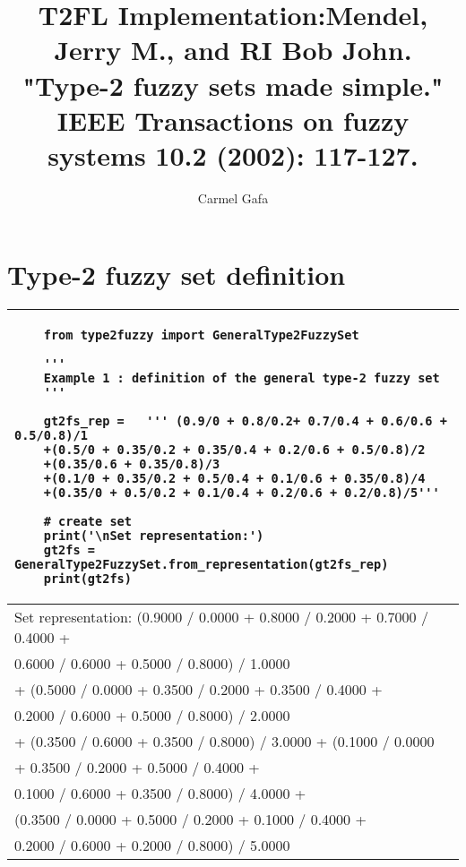 \documentclass[]{article}
\title{T2FL Implementation:Mendel, Jerry M., and RI Bob John. "Type-2 fuzzy sets made simple." IEEE Transactions on fuzzy systems 10.2 (2002): 117-127.}
\author{Carmel Gafa}
\begin{document}
\maketitle

\begin{abstract}

\end{abstract}

\section{Type-2 fuzzy set definition}

\begin{tabular}{|l|}
	\hline 
	\lstset{language=Python}
	\lstset{basicstyle=\scriptsize}
	\begin{lstlisting}
	from type2fuzzy import GeneralType2FuzzySet
	
	'''
	Example 1 : definition of the general type-2 fuzzy set
	'''
	
	gt2fs_rep =   ''' (0.9/0 + 0.8/0.2+ 0.7/0.4 + 0.6/0.6 + 0.5/0.8)/1
	+(0.5/0 + 0.35/0.2 + 0.35/0.4 + 0.2/0.6 + 0.5/0.8)/2
	+(0.35/0.6 + 0.35/0.8)/3
	+(0.1/0 + 0.35/0.2 + 0.5/0.4 + 0.1/0.6 + 0.35/0.8)/4
	+(0.35/0 + 0.5/0.2 + 0.1/0.4 + 0.2/0.6 + 0.2/0.8)/5'''
	
	# create set
	print('\nSet representation:')
	gt2fs = GeneralType2FuzzySet.from_representation(gt2fs_rep)
	print(gt2fs)
	\end{lstlisting}
	
	\\
	\hline
	
	Set representation:
	(0.9000 / 0.0000 + 0.8000 / 0.2000 + 0.7000 / 0.4000 + \\
	0.6000 / 0.6000 + 0.5000 / 0.8000) / 1.0000\\
	 + (0.5000 / 0.0000 + 0.3500 / 0.2000 + 0.3500 / 0.4000 + \\
	 0.2000 / 0.6000 + 0.5000 / 0.8000) / 2.0000 \\
	 + (0.3500 / 0.6000 + 0.3500 / 0.8000) / 3.0000 + (0.1000 / 0.0000\\
	  + 0.3500 / 0.2000 + 0.5000 / 0.4000 +\\
	  0.1000 / 0.6000 + 0.3500 / 0.8000) / 4.0000 + \\
	  (0.3500 / 0.0000 + 0.5000 / 0.2000 + 0.1000 / 0.4000 + \\
	  0.2000 / 0.6000 + 0.2000 / 0.8000) / 5.0000
	
	\\ 
	\hline 
\end{tabular} 
\end{document}
